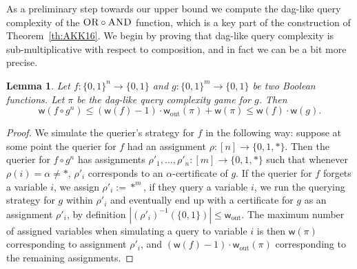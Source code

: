 \documentclass[11pt]{article}
\newcommand{\scterm}[1]{{\textrm{\sc #1}}}
\newcommand{\AND}{{\scterm{AND}}}
\newcommand{\OR}{{\scterm{OR}}}
\newcommand{\dagw}{\mathsf{w}}
\newcommand{\leafw}{\dagw_{\mathrm{out}}}
\numberwithin{equation}{section}
\newtheorem{lemma}[theorem]{Lemma}
\begin{document}
As a preliminary step towards our upper bound we compute the dag-like query complexity of the $\OR \circ \AND$ function, which is a key part of the construction of Theorem~\ref{th:AKK16}. We begin by proving that
dag-like query complexity is sub-multiplicative with respect to composition, and in fact we can be a bit more precise.

\begin{lemma}
\label{lem:composition-and-width}
  Let $f\colon \{0,1\}^n \to \{0,1\}$ and $g\colon \{0,1\}^m \to \{0,1\}$ be two Boolean functions. Let $\pi$ be the dag-like query complexity game for $g$.
  Then \[ \dagw(f \circ g^n) \le (\dagw(f)-1) \cdot \leafw(\pi) + \dagw(\pi) \leq \dagw(f)\cdot\dagw(g). \]
\end{lemma}

\begin{proof}
  We simulate the querier's strategy for $f$ in the following way: suppose at some point the querier for $f$ had an assignment $\rho\colon [n] \to \{0,1,*\}$. Then the querier for $f \circ g^n$ has assignments $\rho'_1, \dots, \rho'_n\colon [m] \to \{0,1, *\}$ such that whenever $\rho(i) = \alpha \neq *$, $\rho'_i$ corresponds to an $\alpha$-certificate of $g$. If the querier for $f$ forgets a variable $i$, we assign $\rho'_i := *^m$, if they query a variable $i$, we run the querying strategy for $g$ within $\rho'_i$ and eventually end up with a certificate for $g$ as an assignment $\rho'_i$, by definition $|(\rho'_i)^{-1}(\{0,1\})| \le \dagw_{\text{out}}$. The maximum number of assigned variables when simulating a query to variable $i$ is then $\dagw(\pi)$ corresponding to assignment $\rho'_i$, and $(\dagw(f)-1) \cdot \dagw_{\text{out}}(\pi)$ corresponding to the remaining assignments.
   \end{proof}
\end{document}
